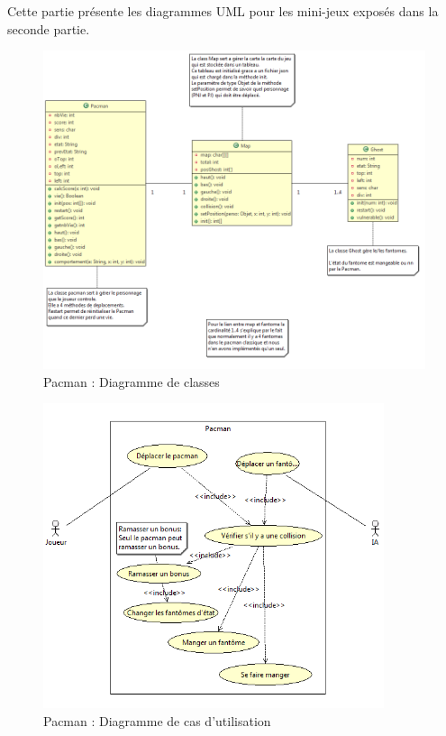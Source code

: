 
Cette partie présente les diagrammes UML pour les mini-jeux exposés dans la seconde partie.

\listoffigures

\clearpage

\begin{figure}[h]
 \centering
 \includegraphics[width=\textwidth]{../umls/UML_images/Pacman/class} \hfill
 \caption{Pacman : Diagramme de classes}
\end{figure}

\begin{figure}[h]
 \centering
 \includegraphics[width=10cm]{../umls/UML_images/Pacman/utilisation}
 \caption{Pacman : Diagramme de cas d'utilisation}
\end{figure}

